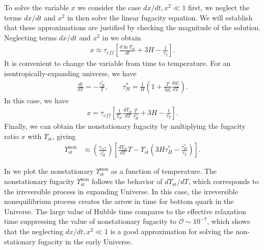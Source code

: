 To solve the variable $x$ we consider the case $dx/dt,x^2\ll1$ first, we neglect the terms $dx/dt$ and $x^2$ in   then solve the linear fugacity equation.  We will establish that these approximations are justified by checking the magnitude of the solution. Neglecting terms $dx/dt$ and $x^2$ in  we obtain
\begin{align}
x\approx\tau_{eff}\left[\frac{d\ln\Upsilon_\mathrm{st}}{dt}+3H-\frac{1}{\tau_T}\right].
\end{align}
It is convenient to change the variable from time to temperature. For an isentropically-expanding universe, we have
\begin{align}\label{tau_H}
\frac{dt}{dT}=-\frac{\tau^\ast_H}{T},\qquad \tau^\ast_H=\frac{1}{H}\left(1+\frac{T}{3g^s_\ast}\frac{dg^s_\ast}{dT}\right).
\end{align}
In this case, we have
\begin{align}
x=\tau_{eff}\left[\frac{1}{\Upsilon_\mathrm{st}}\frac{d\Upsilon_\mathrm{st}}{dT}\frac{T}{\tau^\ast_H}+3H-\frac{1}{\tau_T}\right].
\end{align}
Finally, we can obtain the nonstationary fugacity by multiplying the fugacity ratio $x$ with $\Upsilon_\mathrm{st}$, giving 
\begin{align}
\Upsilon_{\mathrm{st}}^{\mathrm{non}}
&\approx\left(\frac{\tau_{eff}}{\tau^\ast_H}\right)\left[\frac{d\Upsilon_\mathrm{st}}{dT}T-\Upsilon_{\mathrm{st}}\left(3H\tau^\ast_H-\frac{\tau^\ast_H}{\tau_T}\right)\right].
\end{align}

In  we plot the nonstationary $\Upsilon^{\mathrm{non}}_\mathrm{st}$ as a function of temperature. The nonstationary fugacity $\Upsilon^{\mathrm{non}}_\mathrm{st}$ follows the behavior of $d\Upsilon_{\mathrm{st}}/dT$, which corresponds to the irreversible process in expanding Universe. In this case, the irreversible nonequilibrium process creates the arrow in time for bottom quark in the Universe. The large value of Hubble time compares to the effective relaxation time suppressing the value of nonstationary fugacity to $\mathcal{O}\sim10^{-7}$, which shows that the neglecting $dx/dt,x^2\ll1$ is a good approximation for solving the non-stationary fugacity in the early Universe.


